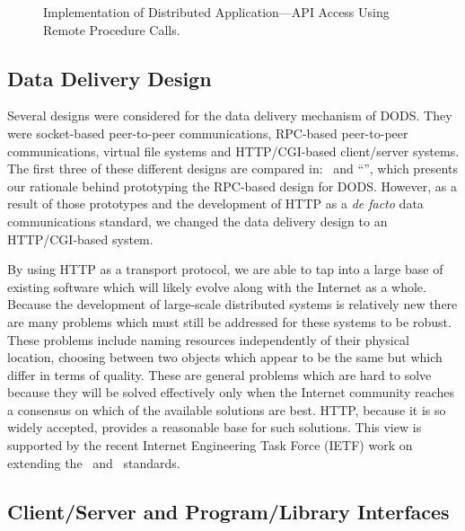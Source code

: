 \begin{figure}
\centerline{}
\caption{Implementation of Distributed Application---API Access Using
  Remote Procedure Calls.}
\label{fig:prog2client-server}
\end{figure}

\subsection {Data Delivery Design}

%
%

Several designs were considered for the data delivery mechanism of DODS.
They were socket-based peer-to-peer communications, RPC-based peer-to-peer
communications, virtual file systems and HTTP/CGI-based client/server
systems. The first three of these different designs are compared in: \wrkshp\ 
and ``\DD'', which presents our rationale behind prototyping the RPC-based
design for DODS. However, as a result of those prototypes and the development
of HTTP as a {\em de facto\/} data communications standard, we changed the
data delivery design to an HTTP/CGI-based system.

By using HTTP as a transport protocol, we are able to tap into a large base
of existing software which will likely evolve along with the Internet as a
whole. Because the development of large-scale distributed systems is
relatively new there are many problems which must still be addressed for
these systems to be robust. These problems include naming resources
independently of their physical location, choosing between two objects which
appear to be the same but which differ in terms of quality. These are general
problems which are hard to solve because they will be solved effectively only
when the Internet community reaches a consensus on which of the available
solutions are best. HTTP, because it is so widely accepted, provides a
reasonable base for such solutions. This view is supported by the recent
Internet Engineering Task Force (IETF)\cite{IETF:url} work on extending the
\HTTP\ and \HTML\ standards.

\subsection{Client/Server and Program/Library Interfaces}

